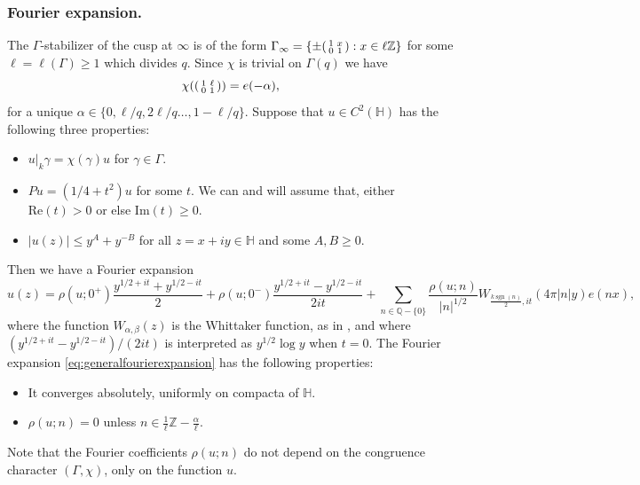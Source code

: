 \documentclass{article}
\theoremstyle{named}
\newcommand{\Z}{\mathbb{Z}}
\newcommand{\Q}{\mathbb{Q}}
\newcommand{\Hyp}{\mathbb{H}}
\DeclareMathOperator{\sgn}{sgn}
\begin{document}
\subsubsection{Fourier expansion.}
The $\Gamma$-stabilizer of the cusp at $\infty$ is of the form $\Gamma_\infty = \{\pm \begin{psmallmatrix}
    1 & x\\
    0 & 1 \end{psmallmatrix}: x \in \ell \Z\}$ for some $\ell = \ell(\Gamma) \geq 1$ which divides $q$. Since $\chi$ is trivial on $\Gamma(q)$ we have 
    \begin{equation}\label{eq:defialpha}
        \chi(\begin{psmallmatrix}
            1 & \ell\\
            0 & 1
        \end{psmallmatrix}) = e(-\alpha),
    \end{equation}
for a unique $\alpha \in \{0, \ell/q, 2\ell/q \ldots, 1 - \ell/q\}$. Suppose that $u \in C^2(\Hyp)$ has the following three properties:
\begin{itemize}
    \item $u|_k \gamma = \chi(\gamma)u$ for $\gamma \in \Gamma$.
    \item $Pu = (1/4 + t^2)u$ for some $t$. We can and will assume that, either $\text{Re}(t) > 0$ or else $\text{Im}(t) \geq 0$.
    \item $|u(z)| \leq y^A  + y^{-B}$ for all $z = x + iy \in \Hyp$ and some $A, B \geq 0$.
\end{itemize}
Then we have a Fourier expansion
\begin{equation}\label{eq:generalfourierexpansion}
    u(z) = \rho(u; 0^+)\frac{y^{1/2 + it} + y^{1/2 - it}}{2} + \rho(u; 0^-)\frac{y^{1/2 + it} - y^{1/2 - it}}{2it} + \sum_{n \in \Q - \{0\}} \frac{\rho(u; n)}{|n|^{1/2}}W_{\frac{k\sgn(n)}{2}, it}(4\pi |n|y)e(nx),
\end{equation}
where the function $W_{\alpha, \beta}(z)$ is the Whittaker function, as in \cite[Equation (4.19)]{DFIsubconvexityartin}, and where $(y^{1/2 + it} - y^{1/2 - it})/(2it)$ is interpreted as $y^{1/2}\log y$ when $t = 0$. The Fourier expansion \eqref{eq:generalfourierexpansion} has the following properties:
\begin{itemize}
    \item It converges absolutely, uniformly on compacta  of $\Hyp$.
    \item $\rho(u; n) = 0$ unless $n \in \frac{1}{\ell}\Z - \frac{\alpha}{\ell}$.
\end{itemize}
Note that the Fourier coefficients $\rho(u; n)$ do not depend on the congruence character $(\Gamma, \chi)$, only on the function $u$.
\end{document}
